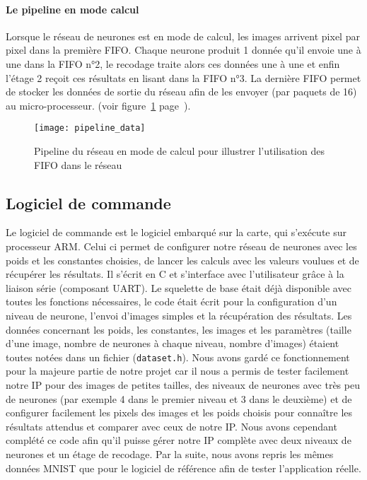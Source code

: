 	\paragraph{Le pipeline en mode calcul}
	Lorsque le réseau de neurones est en mode de calcul, les images arrivent pixel par pixel dans la première FIFO. 
	Chaque neurone produit 1 donnée qu'il envoie une à une dans la FIFO n°2, le recodage traite alors ces 
	données une à une et enfin l'étage 2 reçoit ces résultats en lisant dans la FIFO n°3. La dernière FIFO 
	permet de stocker les données de sortie du réseau afin de les envoyer (par paquets de 16) au micro-processeur. 
	(voir figure~\ref{fig:pipeline_data} page~\pageref{fig:pipeline_data}).
	\begin{figure}[h!]
		\texttt{[image: pipeline\_data]}
		\caption{Pipeline du réseau en mode de calcul pour illustrer l'utilisation des FIFO dans le réseau}
		\label{fig:pipeline_data}
	\end{figure}

\subsection{Logiciel de commande}
Le logiciel de commande est le logiciel embarqué sur la carte, qui s'exécute
sur processeur ARM. Celui ci permet de configurer notre réseau de neurones avec
les poids et les constantes choisies, de lancer les calculs avec les valeurs
voulues et de récupérer les résultats. Il s'écrit en C et s'interface avec
l'utilisateur grâce à la liaison série (composant UART). Le squelette de base
était déjà disponible avec toutes les fonctions nécessaires, le code était
écrit pour la configuration d'un niveau de neurone, l'envoi d'images simples et
la récupération des résultats. Les données
concernant les poids, les constantes, les images et les paramètres (taille d'une
image, nombre de neurones à chaque niveau, nombre d'images) étaient toutes notées
dans un fichier (\texttt{dataset.h}). Nous avons gardé ce fonctionnement pour la
majeure partie de notre projet car il nous a permis de tester facilement notre
IP pour des images de petites tailles, des niveaux de neurones avec très peu
de neurones  (par exemple 4 dans le premier niveau et 3 dans le deuxième) et de configurer facilement les pixels des images et les poids
choisis pour connaître les résultats attendus et comparer avec ceux de notre IP.
Nous avons cependant complété ce code afin qu'il puisse gérer notre IP complète
avec deux niveaux de neurones et un étage de recodage.
Par la suite, nous avons repris les mêmes données MNIST\cite{lecun2010mnist} que pour le logiciel de
référence afin de tester l'application réelle. \\

